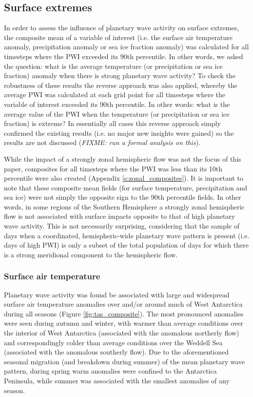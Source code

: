 \subsection{Surface extremes}\label{s:surface_extremes}

In order to assess the influence of planetary wave activity on surface extremes, the composite mean of a variable of interest (i.e. the surface air temperature anomaly, precipitation anomaly or sea ice fraction anomaly) was calculated for all timesteps where the PWI exceeded its 90th percentile. In other words, we asked the question: what is the average temperature (or precipitation or sea ice fraction) anomaly when there is strong planetary wave activity? To check the robustness of these results the reverse approach was also applied, whereby the average PWI was calculated at each grid point for all timesteps where the variable of interest exceeded its 90th percentile. In other words: what is the average value of the PWI when the temperature (or precipitation or sea ice fraction) is extreme? In essentially all cases this reverse approach simply confirmed the existing results (i.e. no major new insights were gained) so the results are not discussed (\textit{FIXME: run a formal analysis on this}).

While the impact of a strongly zonal hemispheric flow was not the focus of this paper, composites for all timesteps where the PWI was less than its 10th percentile were also created (Appendix \ref{s:zonal_composites}). It is important to note that these composite mean fields (for surface temperature, precipitation and sea ice) were not simply the opposite sign to the 90th percentile fields. In other words, in some regions of the Southern Hemisphere a strongly zonal hemispheric flow is not associated with surface impacts opposite to that of high planetary wave activity. This is not necessarily surprising, considering that the sample of days when a coordinated, hemispheric-wide planetary wave pattern is present (i.e. days of high PWI) is only a subset of the total population of days for which there is a strong meridional component to the hemispheric flow.

\subsubsection{Surface air temperature}

Planetary wave activity was found be associated with large and widespread surface air temperature anomalies over and/or around much of West Antarctica during all seasons (Figure \ref{fig:tas_composite}). The most pronounced anomalies were seen during autumn and winter, with warmer than average conditions over the interior of West Antarctica (associated with the anomalous northerly flow) and correspondingly colder than average conditions over the Weddell Sea (associated with the anomalous southerly flow). Due to the aforementioned seasonal migration (and breakdown during summer) of the mean planetary wave pattern, during spring warm anomalies were confined to the Antarctica Peninsula, while summer was associated with the smallest anomalies of any season.  

